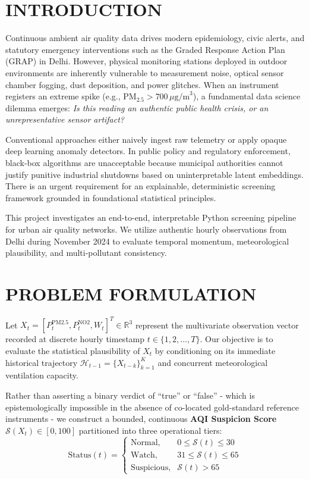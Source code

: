 \documentclass[twoside]{article}
\begin{document}
\section{INTRODUCTION}

Continuous ambient air quality data drives modern epidemiology, civic alerts, and statutory emergency interventions such as the Graded Response Action Plan (GRAP) in Delhi. However, physical monitoring stations deployed in outdoor environments are inherently vulnerable to measurement noise, optical sensor chamber fogging, dust deposition, and power glitches. When an instrument registers an extreme spike (e.g., $\mathrm{PM}_{2.5} > 700\,\mu\mathrm{g/m}^3$), a fundamental data science dilemma emerges: \emph{Is this reading an authentic public health crisis, or an unrepresentative sensor artifact?}

Conventional approaches either naively ingest raw telemetry or apply opaque deep learning anomaly detectors. In public policy and regulatory enforcement, black-box algorithms are unacceptable because municipal authorities cannot justify punitive industrial shutdowns based on uninterpretable latent embeddings. There is an urgent requirement for an explainable, deterministic screening framework grounded in foundational statistical principles.

This project investigates an end-to-end, interpretable Python screening pipeline for urban air quality networks. We utilize authentic hourly observations from Delhi during November 2024 to evaluate temporal momentum, meteorological plausibility, and multi-pollutant consistency.

\section{PROBLEM FORMULATION}

Let $X_t = [P_{t}^{\mathrm{PM2.5}}, P_{t}^{\mathrm{NO2}}, W_{t}]^T \in \mathbb{R}^3$ represent the multivariate observation vector recorded at discrete hourly timestamp $t \in \{1, 2, \dots, T\}$. Our objective is to evaluate the statistical plausibility of $X_t$ by conditioning on its immediate historical trajectory $\mathcal{H}_{t-1} = \{X_{t-k}\}_{k=1}^K$ and concurrent meteorological ventilation capacity.

Rather than asserting a binary verdict of ``true'' or ``false'' - which is epistemologically impossible in the absence of co-located gold-standard reference instruments - we construct a bounded, continuous \textbf{AQI Suspicion Score} $\mathcal{S}(X_t) \in [0, 100]$ partitioned into three operational tiers:
\begin{equation}
\mathrm{Status}(t) = \begin{cases} 
\text{Normal}, & 0 \le \mathcal{S}(t) \le 30 \\
\text{Watch}, & 31 \le \mathcal{S}(t) \le 65 \\
\text{Suspicious}, & \mathcal{S}(t) > 65 
\end{cases}
\end{equation}
\end{document}
